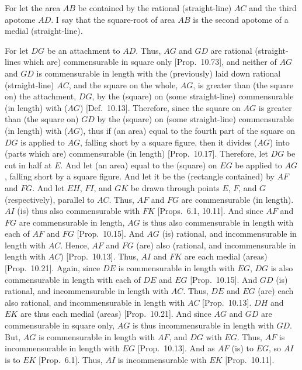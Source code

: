 \begin{Parallel}{}{}
{For let the area $AB$ be contained by the rational (straight-line)
$AC$ and the third apotome $AD$. I say that the square-root of area $AB$
is the second apotome of a medial (straight-line).

\epsfysize=1.3in
\centerline{}

For let $DG$ be an attachment to $AD$. Thus, $AG$ and $GD$ are rational (straight-lines which are) commensurable in square only [Prop.~10.73], and neither of $AG$ and $GD$
is commensurable in length with the (previously) laid down rational (straight-line) $AC$, and the square on the whole, $AG$, is greater than
(the square on) the attachment, $DG$, by the (square) on (some straight-line)
commensurable (in length) with ($AG$) [Def.~10.13]. 
Therefore, since the square on $AG$ is greater than (the square on)
$GD$ by the (square) on (some straight-line) commensurable (in length)
with ($AG$), thus if (an area) equal to the fourth part of the square on $DG$
is applied to $AG$, falling short by a square figure, then it divides ($AG$)
into (parts which are) commensurable (in length) [Prop.~10.17]. Therefore, let $DG$ be
cut in half at $E$. And let (an area) equal to the (square) on $EG$
be applied to $AG$, falling short by a square figure.
And let it be the (rectangle contained) by $AF$ and $FG$. And let
$EH$, $FI$, and $GK$ be drawn through points $E$, $F$, and $G$
(respectively), parallel to $AC$. Thus, $AF$ and $FG$ are
commensurable (in length). $AI$ (is) thus also commensurable with
$FK$ [Props.~6.1, 10.11]. 
 And since $AF$ and $FG$ are commensurable
in length, $AG$ is thus also commensurable in length with each of
$AF$ and $FG$ [Prop.~10.15]. And
$AG$ (is) rational, and incommensurable in length with $AC$. 
Hence, $AF$ and $FG$ (are) also (rational, and incommensurable in length
with $AC$) [Prop.~10.13]. 
Thus, $AI$ and $FK$ are each medial (areas) [Prop.~10.21]. Again, since $DE$ is commensurable
in length with $EG$, $DG$ is also commensurable
in length with each of $DE$ and $EG$ [Prop.~10.15]. And $GD$ (is) rational, and incommensurable in length with $AC$. Thus, $DE$ and $EG$ (are)
each also rational, and incommensurable in length with $AC$ [Prop.~10.13]. $DH$ and $EK$ are thus
each medial (areas) [Prop.~10.21]. And since 
$AG$ and $GD$ are commensurable in square only, $AG$ is thus
incommensurable in length with $GD$. But, $AG$ is commensurable in
length with $AF$, and $DG$ with $EG$. Thus, $AF$ is incommensurable
in length with $EG$ [Prop.~10.13]. 
And as $AF$ (is) to $EG$, so $AI$ is to $EK$ [Prop.~6.1]. Thus, $AI$ is incommensurable with $EK$ [Prop.~10.11].

}
\end{Parallel}
